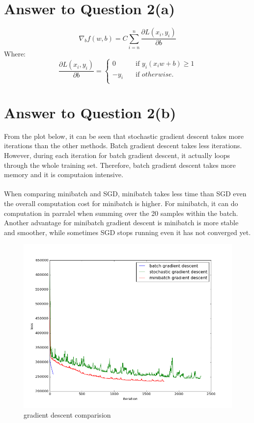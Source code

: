 \documentclass[11pt]{article}
\begin{document}
\pagebreak[4]
\section*{Answer to Question 2(a)}
$$
\nabla_b f(w, b) = C\sum_{i=n}^{n}\frac{\partial L(x_i, y_i)}{\partial b}
$$
Where:
$$
\frac{\partial L(x_i, y_i)}{\partial b} =
  \begin{cases}
    0       & \quad \text{if } y_i(x_i w + b) \geq 1\\
    -y_i  & \quad \text{if } otherwise.\\
  \end{cases}
$$

\pagebreak[4]
\section*{Answer to Question 2(b)}
From the plot below, it can be seen that stochastic gradient descent takes more iterations than the other methods.
Batch gradient descent takes less iterations. However, during each iteration for batch gradient descent,
it actually loops through the whole training set. Therefore, batch gradient descent takes more memory and it is computaion intensive.\\
\\
When comparing minibatch and SGD, minibatch takes less time than SGD even the overall computation cost for minibatch is higher.
For minibatch, it can do computation in parralel when summing over the 20 samples within the batch.
Another advantage for minibatch gradient descent is minibatch is more stable and smoother, while sometimes SGD stops running even it has not converged yet.

\begin{figure}[h]
\center
\includegraphics[scale=0.5]{gradientDescent.png}
\caption{gradient descent comparision}
\end{figure}
\end{document}
